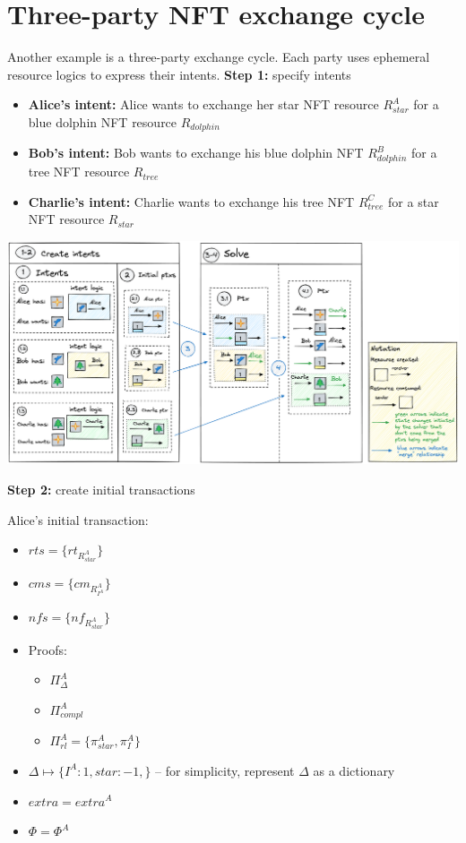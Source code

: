 
\appendix
\section{Three-party NFT exchange cycle}
Another example is a three-party exchange cycle. Each party uses ephemeral resource logics to express their intents.
\hfill\break
\hfill\break
\textbf{Step 1:} specify intents

\begin{itemize}
    \item \textbf{Alice's intent:} Alice wants to exchange her star NFT resource $R^A_{star}$ for a blue dolphin NFT resource $R_{dolphin}$
    \item \textbf{Bob's intent:} Bob wants to exchange his blue dolphin NFT $R^B_{dolphin}$ for a tree NFT resource $R_{tree}$
    \item \textbf{Charlie's intent:} Charlie wants to exchange his tree NFT $R^C_{tree}$ for a star NFT resource $R_{star}$
\end{itemize}

\begin{center}
    \includegraphics[width = \textwidth]{3party_rm_new.png}
\end{center}

\textbf{Step 2:} create initial transactions

Alice's initial transaction:
\begin{itemize}
    \item $rts= \{rt_{R^A_{star}}\}$
    \item $cms = \{cm_{R^A_{I^{A}}}\}$
    \item $nfs = \{nf_{R^A_{star}}\}$
    \item Proofs:
    \begin{itemize}
        \item $\Pi^A_{\Delta}$
        \item $\Pi^A_{compl}$
        \item $\Pi^A_{rl} = \{\pi^A_{star}, \pi^A_I\}$
    \end{itemize}
    \item $\Delta \mapsto \{I^{A}: 1, star: -1, \}$ – for simplicity, represent $\Delta$ as a dictionary
    \item $extra = extra^A$
    \item $\Phi = \Phi^A$
\end{itemize}

